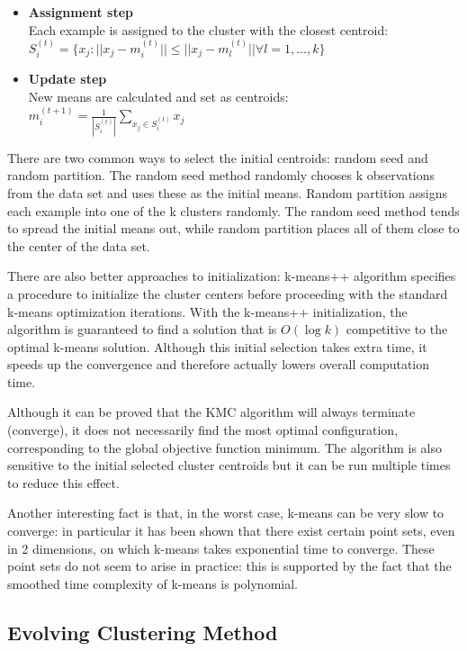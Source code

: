 \documentclass[]{IEEEphot}
\begin{document}
\begin{itemize}
\item \textbf{Assignment step}\\
  Each example is assigned to the cluster with the closest centroid:\\
  $S_i^{(t)} = \{x_j : ||x_j - m_i^{(t)}|| \le ||x_j - m_l^{(t)}|| \forall l = 1, ..., k\}$
\\
\item \textbf{Update step}\\
  New means are calculated and set as centroids:\\
  $m_i^{(t+1)} = \frac{1}{|S_i^{(t)}|} \displaystyle\sum\limits_{x_j \in S_i^{(t)}}{x_j}$
\end{itemize}

There are two common ways to select the initial centroids: random seed and random partition.
The random seed method randomly chooses k observations from the data set
and uses these as the initial means. Random partition
assigns each example into one of the k clusters randomly.
The random seed method tends to spread the initial means out, while random partition
places all of them close to the center of the data set.

There are also better approaches to initialization: k-means++ algorithm specifies a
procedure to initialize the cluster centers before proceeding with the standard k-means
optimization iterations. With the k-means++ initialization, the algorithm is guaranteed
to find a solution that is $O(\log k)$ competitive to the optimal k-means solution.
Although this initial selection takes extra time, it speeds up the convergence and 
therefore actually lowers overall computation time.

Although it can be proved that the KMC algorithm will always terminate (converge),
it does not necessarily find the most optimal configuration,
corresponding to the global objective function minimum. The algorithm is also sensitive
to the initial selected cluster centroids but it can be run multiple times to reduce this effect.

Another interesting fact is that, in the worst case, k-means can be very slow to converge:
in particular it has been shown that there exist certain point sets,
even in 2 dimensions, on which k-means takes exponential time to converge.
These point sets do not seem to arise in practice: this is supported by the
fact that the smoothed time complexity of k-means is polynomial.

\subsection{Evolving Clustering Method}
\end{document}
